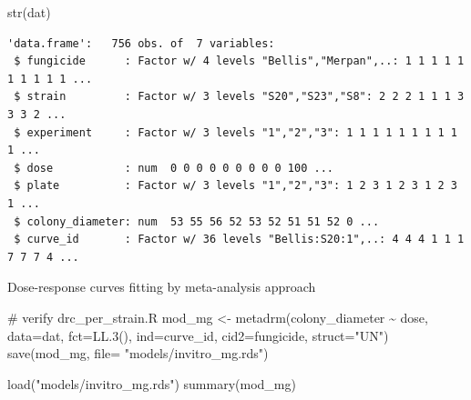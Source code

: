 \documentclass[
  letterpaper,
  DIV=11,
  numbers=noendperiod]{scrreport}
\newenvironment{Shaded}{\begin{snugshade}}{\end{snugshade}}
\newcommand{\AttributeTok}[1]{\textcolor[rgb]{0.40,0.45,0.13}{#1}}
\newcommand{\CommentTok}[1]{\textcolor[rgb]{0.37,0.37,0.37}{#1}}
\newcommand{\FunctionTok}[1]{\textcolor[rgb]{0.28,0.35,0.67}{#1}}
\newcommand{\NormalTok}[1]{\textcolor[rgb]{0.00,0.23,0.31}{#1}}
\newcommand{\OtherTok}[1]{\textcolor[rgb]{0.00,0.23,0.31}{#1}}
\newcommand{\SpecialCharTok}[1]{\textcolor[rgb]{0.37,0.37,0.37}{#1}}
\newcommand{\StringTok}[1]{\textcolor[rgb]{0.13,0.47,0.30}{#1}}
\begin{document}
\begin{Shaded}
\begin{Highlighting}[]
\FunctionTok{str}\NormalTok{(dat)}
\end{Highlighting}
\end{Shaded}

\begin{verbatim}
'data.frame':   756 obs. of  7 variables:
 $ fungicide      : Factor w/ 4 levels "Bellis","Merpan",..: 1 1 1 1 1 1 1 1 1 1 ...
 $ strain         : Factor w/ 3 levels "S20","S23","S8": 2 2 2 1 1 1 3 3 3 2 ...
 $ experiment     : Factor w/ 3 levels "1","2","3": 1 1 1 1 1 1 1 1 1 1 ...
 $ dose           : num  0 0 0 0 0 0 0 0 0 100 ...
 $ plate          : Factor w/ 3 levels "1","2","3": 1 2 3 1 2 3 1 2 3 1 ...
 $ colony_diameter: num  53 55 56 52 53 52 51 51 52 0 ...
 $ curve_id       : Factor w/ 36 levels "Bellis:S20:1",..: 4 4 4 1 1 1 7 7 7 4 ...
\end{verbatim}

Dose-response curves fitting by meta-analysis approach

\begin{Shaded}
\begin{Highlighting}[]
\CommentTok{\# verify drc\_per\_strain.R}
\NormalTok{mod\_mg }\OtherTok{\textless{}{-}} \FunctionTok{metadrm}\NormalTok{(colony\_diameter }\SpecialCharTok{\textasciitilde{}}\NormalTok{ dose, }
               \AttributeTok{data=}\NormalTok{dat,}
               \AttributeTok{fct=}\FunctionTok{LL.3}\NormalTok{(),}
               \AttributeTok{ind=}\NormalTok{curve\_id,}
               \AttributeTok{cid2=}\NormalTok{fungicide,}
               \AttributeTok{struct=}\StringTok{"UN"}\NormalTok{)}
\FunctionTok{save}\NormalTok{(mod\_mg, }\AttributeTok{file=} \StringTok{"models/invitro\_mg.rds"}\NormalTok{)}
\end{Highlighting}
\end{Shaded}

\begin{Shaded}
\begin{Highlighting}[]
\FunctionTok{load}\NormalTok{(}\StringTok{"models/invitro\_mg.rds"}\NormalTok{)}
\FunctionTok{summary}\NormalTok{(mod\_mg)}
\end{Highlighting}
\end{Shaded}
\end{document}
